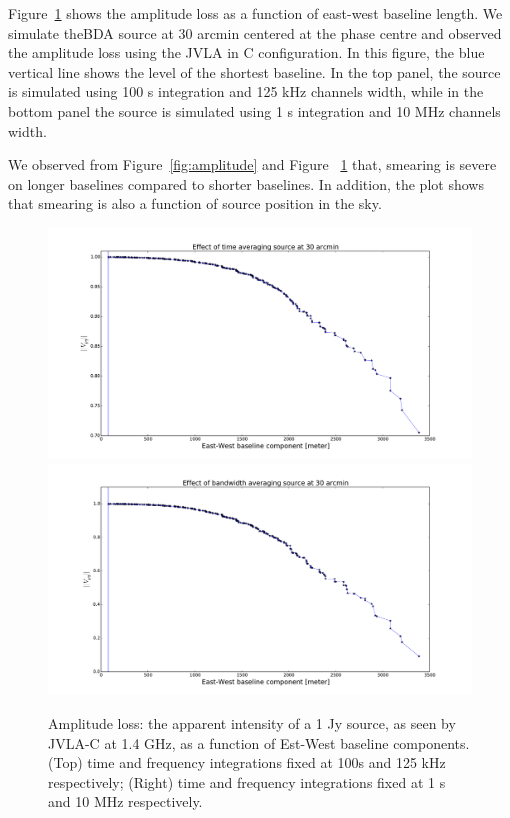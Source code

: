 \documentclass[useAMS,usenatbib]{mn2e}
\begin{document}
Figure~\ref{fig:srcat30arcmin_avg} shows the amplitude loss as  a function of east-west baseline length. We simulate theBDA source at 
30 arcmin centered at the phase centre and observed the amplitude loss using the JVLA in C configuration.
In this figure, the blue vertical line shows the level of the shortest baseline. In the top panel, the source is
simulated using 100 s integration and 125 kHz channels width, while in the bottom panel the source is simulated using 1 s integration
and 10 MHz channels width.

We observed from  Figure~\ref{fig:amplitude} and Figure ~\ref{fig:srcat30arcmin_avg} that, smearing is severe on  
longer baselines compared to shorter baselines. In addition, the plot 
shows that smearing is also a function of source position in the sky. 

\begin{figure}
\includegraphics[width=.7\textwidth]{./Figures/effect_time_averaging_amplitude_src30arcmin.pdf}\\
\includegraphics[width=.7\textwidth]{./Figures/effect_bandwidth_averaging_amplitude_src30arcmin.pdf}
\caption{Amplitude loss: the apparent intensity of a 1 Jy source, as seen by JVLA-C at 1.4 GHz, 
as a function of Est-West baseline components. (Top) time and frequency integrations fixed at  100s and 125 kHz respectively; 
(Right) time and frequency integrations fixed at  1 s and 10 MHz respectively.}\label{fig:srcat30arcmin_avg}
\end{figure}
\end{document}
